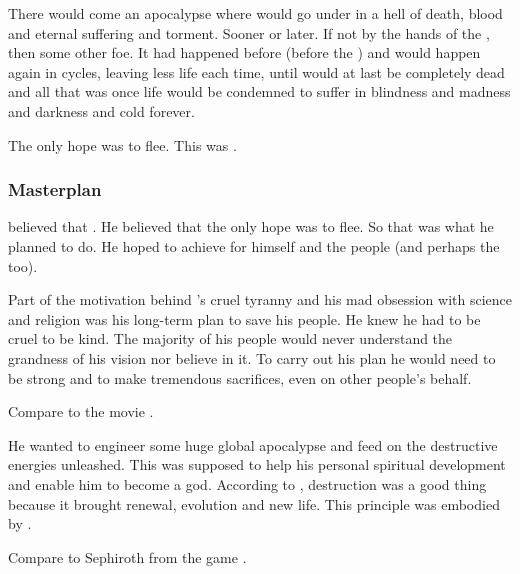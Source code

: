 There would come an apocalypse where \Miith would go under in a hell of death, blood and eternal suffering and torment. 
Sooner or later. 
If not by the hands of the \banes, then some other foe. 
It had happened before (before the \ophidians) and would happen again in cycles, leaving less life each time, until \Miith would at last be completely dead and all that was once life would be condemned to suffer in blindness and madness and darkness and cold forever. 

The only hope was to flee. 
This was . 





\subsubsection{Masterplan}
\Sethicus believed that .
He believed that the only hope was to flee.
So that was what he planned to do. 
He hoped to achieve  for himself and the \draconian people (and perhaps the \ophidians too). 

Part of the motivation behind \Sethicus's cruel tyranny and his mad obsession with science and religion was his long-term plan to save his people. 
He knew he had to be cruel to be kind. 
The majority of his people would never understand the grandness of his vision nor believe in it. 
To carry out his plan he would need to be strong and to make tremendous sacrifices, even on other people's behalf. 

Compare to the movie \cite{Movie:Watchmen}. 

He wanted to engineer some huge global apocalypse and feed on the destructive energies unleashed. 
This was supposed to help his personal spiritual development and enable him to become a god. 
According to , destruction was a good thing because it brought renewal, evolution and new life. 
This principle was embodied by .

Compare \Sethicus to Sephiroth from the game \cite{VideoGame:FinalFantasyVII}.


